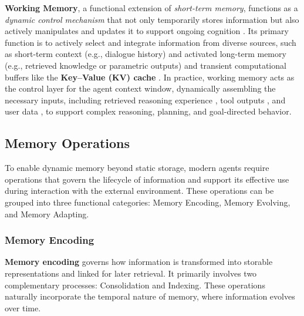 \documentclass[manuscript,screen]{acmart}
\begin{document}
\textbf{Working Memory}, a functional extension of \textit{short-term memory}, functions as a \textit{dynamic control mechanism} that not only temporarily stores information but also actively manipulates and updates it to support ongoing cognition \citep{wang2025graphcogent, rasmussen2025zep}. Its primary function is to actively select and integrate information from diverse sources, such as short-term context (e.g., dialogue history) and activated long-term memory (e.g., retrieved knowledge or parametric outputs) and transient computational buffers like the \textbf{Key–Value (KV) cache} \citep{chen2024improving, mem0}. In practice, working memory acts as the control layer \citep{li2025memos} for the agent context window, dynamically assembling the necessary inputs, including retrieved reasoning experience \citep{ouyang2025reasoningbank}, tool outputs \citep{lumer2025memtool}, and user data \citep{wang2025new}, to support complex reasoning, planning, and goal-directed behavior.

\subsection{Memory Operations}
\label{sec:memory_operation}
To enable dynamic memory beyond static storage, modern agents require operations that govern the lifecycle of information and support its effective use during interaction with the external environment. These operations can be grouped into three functional categories: Memory Encoding, Memory Evolving, and Memory Adapting.

\subsubsection{Memory Encoding}
\textbf{Memory encoding} governs how information is transformed into storable representations and linked for later retrieval. It primarily involves two complementary processes: Consolidation and Indexing. These operations naturally incorporate the temporal nature of memory, where information evolves over time.
\end{document}
